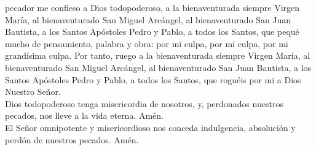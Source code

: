 pecador me confieso a Dios todopoderoso, a la bienaventurada siempre Virgen María, al bienaventurado San Miguel Arcángel,
al bienaventurado San Juan Bautista, a los Santos Apóstoles Pedro y Pablo, a todos los Santos, que pequé mucho
de pensamiento, palabra y obra: por mi culpa, por mi culpa, por mi grandísima culpa. Por tanto, ruego a la bienaventurada
siempre Virgen María, al bienaventurado San Miguel Arcángel, al bienaventurado San Juan Bautista, a los Santos Apóstoles
Pedro y Pablo, a todos los Santos, que roguéis por mi a Dios Nuestro Señor.\\[2mm]
Dios todopoderoso tenga misericordia de nosotros, y, perdonados nuestros pecados, nos lleve a la vida eterna. Amén.\\[2mm]
El Señor omnipotente y misericordioso nos conceda indulgencia, absolución y perdón de nuestros pecados. Amén.